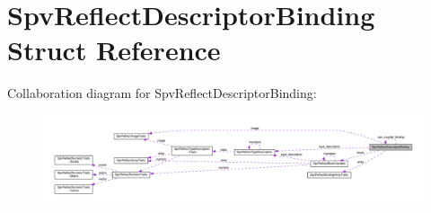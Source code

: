 \hypertarget{structSpvReflectDescriptorBinding}{}\section{Spv\+Reflect\+Descriptor\+Binding Struct Reference}
\label{structSpvReflectDescriptorBinding}


Collaboration diagram for Spv\+Reflect\+Descriptor\+Binding\+:\nopagebreak
\begin{figure}[H]
\begin{center}
\leavevmode
\includegraphics[width=350pt]{structSpvReflectDescriptorBinding__coll__graph}
\end{center}
\end{figure}
